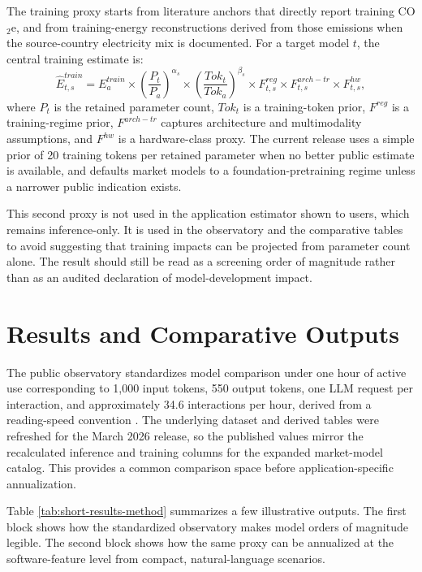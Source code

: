 \documentclass[runningheads]{llncs}
\begin{document}
The training proxy starts from literature anchors that directly report training CO$_2$e, and from training-energy reconstructions derived from those emissions when the source-country electricity mix is documented. For a target model $t$, the central training estimate is:
\begin{equation}
\hat{E}^{train}_{t,s} = E^{train}_a \times \left(\frac{P_t}{P_a}\right)^{\alpha_s}
\times \left(\frac{Tok_t}{Tok_a}\right)^{\beta_s}
\times F^{reg}_{t,s} \times F^{arch-tr}_{t,s} \times F^{hw}_{t,s},
\end{equation}
where $P_t$ is the retained parameter count, $Tok_t$ is a training-token prior, $F^{reg}$ is a training-regime prior, $F^{arch-tr}$ captures architecture and multimodality assumptions, and $F^{hw}$ is a hardware-class proxy. The current release uses a simple prior of 20 training tokens per retained parameter when no better public estimate is available, and defaults market models to a foundation-pretraining regime unless a narrower public indication exists.

This second proxy is not used in the application estimator shown to users, which remains inference-only. It is used in the observatory and the comparative tables to avoid suggesting that training impacts can be projected from parameter count alone. The result should still be read as a screening order of magnitude rather than as an audited declaration of model-development impact.

\section{Results and Comparative Outputs}
The public observatory standardizes model comparison under one hour of active use corresponding to 1,000 input tokens, 550 output tokens, one LLM request per interaction, and approximately 34.6 interactions per hour, derived from a reading-speed convention \cite{brysbaert2019}. The underlying dataset and derived tables were refreshed for the March 2026 release, so the published values mirror the recalculated inference and training columns for the expanded market-model catalog. This provides a common comparison space before application-specific annualization.

Table \ref{tab:short-results-method} summarizes a few illustrative outputs. The first block shows how the standardized observatory makes model orders of magnitude legible. The second block shows how the same proxy can be annualized at the software-feature level from compact, natural-language scenarios.
\end{document}
